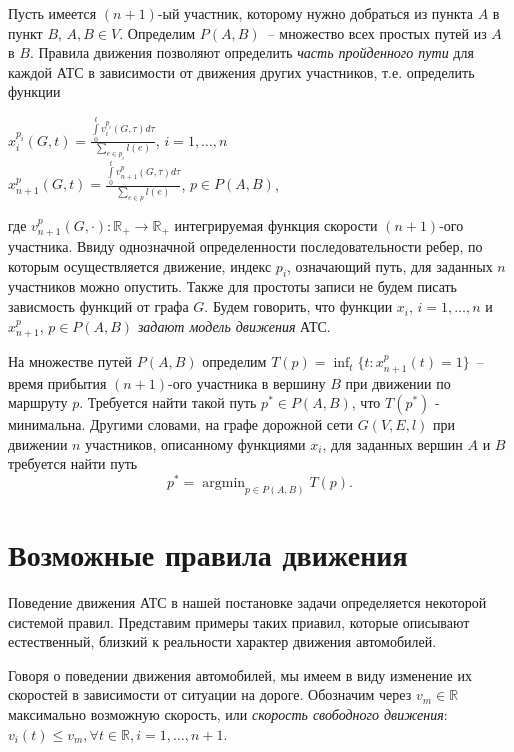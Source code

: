 \documentclass[12pt, a4paper]{article}
\DeclareMathOperator*{\argmin}{argmin}
\begin{document}
Пусть имеется $(n+1)$-ый участник, которому нужно добраться из пункта $A$ в пункт $B$, $A, B \in V$. Определим $P(A,B)$~-- множество всех простых путей из $A$ в $B$. Правила движения позволяют определить \textit{часть пройденного пути} для каждой АТС в зависимости от движения других участников, т.е. определить функции
\begin{center}
 $x^{p_i}_i(G, t) = \frac{\int\limits_0^t v^{p_i}_i(G, \tau)d\tau}{\sum\limits_{e \in p_i}l(e)} $, $i = 1, \dots, n$ \\ 
 $x^{p}_{n+1}(G, t) = \frac{\int\limits_0^t v^p_{n+1}(G, \tau)d\tau}{\sum\limits_{e \in p}l(e)} $, $p \in P(A, B) $, 
\end{center}
где $v^p_{n+1}(G, \cdot) : \mathbb{R}_+ \rightarrow \mathbb{R}_+$ интегрируемая функция скорости $(n+1)$-ого участника.
Ввиду однозначной определенности последовательности ребер, по которым осуществляется движение, индекс $p_i$, означающий путь, для заданных $n$ участников можно опустить. Также для простоты записи не будем писать зависмость функций от графа $G$.
Будем говорить, что функции $x_i$, $i = 1, \dots, n$ и $x^p_{n+1}$, $p \in P(A, B)$
\textit{задают модель движения} АТС.

На множестве путей $P(A,B)$ определим $T(p) = \displaystyle \inf_t \{t : x^p_{n+1}(t) = 1\}$~-- время прибытия $(n+1)$-ого участника в вершину $B$ при движении по маршруту $p$. Требуется найти такой путь $p^* \in P(A, B)$, что $T(p^*)$ - минимальна. Другими словами, на графе дорожной сети $G(V, E, l)$ при движении $n$ участников, описанному функциями $x_i$, для заданных вершин $A$ и $B$ требуется найти путь
$$p^* = \argmin_{p \in P(A, B)} T(p).$$

\newpage
\section{Возможные правила движения}

Поведение движения АТС в нашей постановке задачи определяется некоторой системой правил. Представим примеры таких приавил, которые описывают естественный, близкий к реальности характер движения автомобилей.

Говоря о поведении движения автомобилей, мы имеем в виду изменение их скоростей в зависимости от ситуации на дороге. Обозначим через $v_m \in \mathbb {R}$ максимально возможную скорость, или \textit{скорость свободного движения}: $v_i(t) \leq v_m, \forall t \in \mathbb {R}, i = 1, \dots, n+1$.
\end{document}
